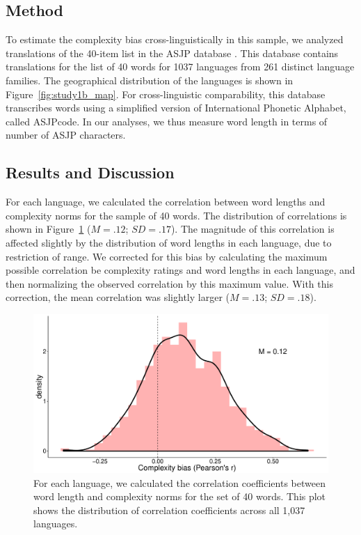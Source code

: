 \subsection{Method}
To estimate the complexity bias cross-linguistically in this sample, we analyzed translations of the 40-item list in the  ASJP database \cite{asjp}. This database contains translations for the list of 40 words for 1037 languages from 261 distinct language families. The geographical distribution of the languages is shown in Figure\ \ref{fig:study1b_map}. For cross-linguistic comparability, this database transcribes words using a simplified version of International Phonetic Alphabet, called ASJPcode. In our analyses, we thus measure word length in terms of number of ASJP characters.

\subsection{Results and Discussion}
For each language, we calculated the correlation between word lengths and complexity norms for the sample of 40 words. The distribution of correlations is shown in  
Figure\ \ref{fig:study1b} ($M = .12$; $SD = .17$). The magnitude of this correlation is affected slightly by the distribution of word lengths in each language, due to restriction of range. We corrected for this bias by calculating the maximum possible correlation be complexity ratings and word lengths in each language, and then normalizing the observed correlation by this maximum value. With this correction, the mean correlation was slightly larger ($M = .13$; $SD = .18$). 

\begin{figure}[t!]
\begin{center}
\includegraphics[scale = .35]{figs/chap4_1b.pdf}
\end{center}
\caption{For each language, we calculated the correlation coefficients between word length and complexity norms for the set of 40 words. This plot shows the distribution of correlation coefficients across all 1,037 languages. }
\label{fig:study1b}
\end{figure}


